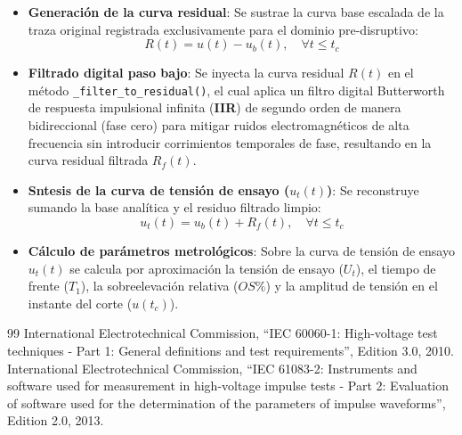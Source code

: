 \begin{itemize}
    \item \textbf{Generación de la curva residual}: Se sustrae la curva base escalada de la traza original registrada exclusivamente para el dominio pre-disruptivo:
    \begin{equation}
    \label{eq:residual_lic}
    R(t) = u(t) - u_b(t), \quad \forall t \le t_c
    \end{equation}
    \item \textbf{Filtrado digital paso bajo}: Se inyecta la curva residual $R(t)$ en el método \texttt{\_filter\_to\_residual()}, el cual aplica un filtro digital Butterworth de respuesta impulsional infinita (\textbf{IIR}) de segundo orden de manera bidireccional (fase cero) para mitigar ruidos electromagnéticos de alta frecuencia sin introducir corrimientos temporales de fase, resultando en la curva residual filtrada $R_f(t)$.
    \item \textbf{Sntesis de la curva de tensión de ensayo ($u_t(t)$)}: Se reconstruye sumando la base analítica y el residuo filtrado limpio:
    \begin{equation}
    \label{eq:curva_ensayo_lic}
    u_t(t) = u_b(t) + R_f(t), \quad \forall t \le t_c
    \end{equation}
    \item \textbf{Cálculo de parámetros metrológicos}: Sobre la curva de tensión de ensayo $u_t(t)$ se calcula por aproximación la tensión de ensayo ($U_t$), el tiempo de frente ($T_1$), la sobreelevación relativa ($OS\%$) y la amplitud de tensión en el instante del corte ($u(t_c)$).
\end{itemize}

\begin{thebibliography}{99}
     International Electrotechnical Commission, ``IEC 60060-1: High-voltage test techniques - Part 1: General definitions and test requirements'', Edition 3.0, 2010.
     International Electrotechnical Commission, ``IEC 61083-2: Instruments and software used for measurement in high-voltage impulse tests - Part 2: Evaluation of software used for the determination of the parameters of impulse waveforms'', Edition 2.0, 2013.
\end{thebibliography}